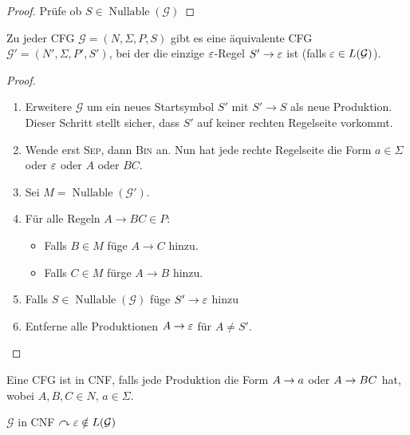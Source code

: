 \begin{proof}
  Prüfe ob $S \in \operatorname{Nullable}(\mathcal{G})$
\end{proof}
\begin{lemma}
  Zu jeder CFG $\mathcal{G}=(N, \Sigma, P, S)$ gibt es eine äquivalente CFG $\mathcal{G'} =(N', \Sigma, P', S')$, bei der die einzige $\varepsilon$-Regel $S' \to \varepsilon$ ist (falls $\varepsilon \in L(\mathcal{G})$).
\end{lemma}
\begin{proof}
  \begin{enumerate}
  \item Erweitere $\mathcal{G}$ um ein neues Startsymbol $S'$ mit $S' \to S$ als neue Produktion.
    Dieser Schritt stellt sicher, dass $S'$ auf keiner rechten Regelseite vorkommt.
  \item Wende erst \textsc{Sep}, dann \textsc{Bin} an.
    Nun hat jede rechte Regelseite die Form $a \in \Sigma$ oder $\varepsilon$ oder $A$ oder $BC$.
  \item Sei $M = \operatorname{Nullable}(\mathcal{G}')$.
  \item Für alle Regeln $A \to BC \in P$:
    \begin{itemize}
    \item Falls $B \in M$ füge $A \to C$ hinzu.
    \item Falls $C \in M$ fürge $A \to B$ hinzu.
    \end{itemize}
  \item Falls $S \in \operatorname{Nullable}(\mathcal{G})$ füge $S' \to \varepsilon$ hinzu
  \item Entferne alle Produktionen $A \to \varepsilon$ für $A \neq S'$.
  \end{enumerate}
\end{proof}


\begin{Def}[name={[\acs*{CFG} in \acs*{CNF}]}]
	Eine \ac{CFG} ist in \ac{CNF}, falls jede Produktion die Form $A\->a$ oder $A\->BC$ hat, wobei $A,B,C\in N$, $a\in\Sigma$.
\end{Def}




\begin{Beobachtung}
	$\mathcal{G}$ in \ac{CNF} $\curvearrowright \varepsilon \notin L(\mathcal{G})$
\end{Beobachtung}
	

